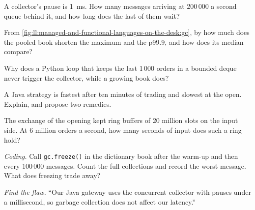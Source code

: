 \begin{exercise}[$\star$]\label{exo:ll:managed-and-functional-languages-on-the-desk:2}
A collector's pause is \qty{1}{\milli\second}. How many messages arriving at 200\,000 a second queue behind it, and how long
does the last of them wait?
\end{exercise}

\begin{exercise}[$\star$]\label{exo:ll:managed-and-functional-languages-on-the-desk:3}
From \cref{fig:ll:managed-and-functional-languages-on-the-desk:gc}, by how much does the pooled book shorten the maximum and
the p99.9, and how does its median compare?
\end{exercise}

\begin{exercise}[$\star\star$]\label{exo:ll:managed-and-functional-languages-on-the-desk:4}
Why does a Python loop that keeps the last 1\,000 orders in a bounded deque never trigger the collector, while a growing book
does?
\end{exercise}

\begin{exercise}[$\star\star$]\label{exo:ll:managed-and-functional-languages-on-the-desk:5}
A Java strategy is fastest after ten minutes of trading and slowest at the open. Explain, and propose two remedies.
\end{exercise}

\begin{exercise}[$\star\star$]\label{exo:ll:managed-and-functional-languages-on-the-desk:6}
The exchange of the opening kept ring buffers of 20 million slots on the input side. At 6 million orders a second, how many
seconds of input does such a ring hold?
\end{exercise}

\begin{exercise}[$\star\star\star$]\label{exo:ll:managed-and-functional-languages-on-the-desk:7}
\emph{Coding.} Call \texttt{gc.freeze()} in the dictionary book after the warm-up and then every 100\,000 messages. Count the
full collections and record the worst message. What does freezing trade away?
\end{exercise}

\begin{exercise}[$\star\star\star$]\label{exo:ll:managed-and-functional-languages-on-the-desk:8}
\emph{Find the flaw.} ``Our Java gateway uses the concurrent collector with pauses under a millisecond, so garbage collection
does not affect our latency.''
\end{exercise}

